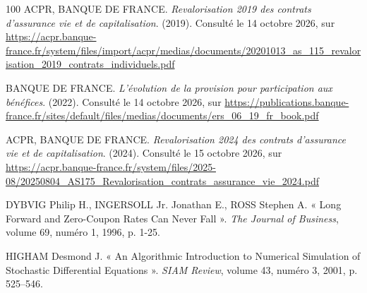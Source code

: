 \begin{thebibliography}{100}
ACPR, BANQUE DE FRANCE. \textit{Revalorisation 2019 des contrats d'assurance vie et de capitalisation}. (2019). Consulté le 14 octobre 2026, sur \url{https://acpr.banque-france.fr/system/files/import/acpr/medias/documents/20201013_as_115_revalorisation_2019_contrats_individuels.pdf}

BANQUE DE FRANCE. \textit{L'évolution de la provision pour participation aux bénéfices}. (2022). Consulté le 14 octobre 2026, sur \url{https://publications.banque-france.fr/sites/default/files/medias/documents/ers_06_19_fr_book.pdf}

ACPR, BANQUE DE FRANCE. \textit{Revalorisation 2024 des contrats d'assurance vie et de capitalisation}. (2024). Consulté le 15 octobre 2026, sur \url{https://acpr.banque-france.fr/system/files/2025-08/20250804_AS175_Revalorisation_contrats_assurance_vie_2024.pdf}

DYBVIG Philip H., INGERSOLL Jr. Jonathan E., ROSS Stephen A. « Long Forward and Zero-Coupon Rates Can Never Fall ». \textit{The Journal of Business}, volume 69, numéro 1, 1996, p. 1-25.

HIGHAM Desmond J. « An Algorithmic Introduction to Numerical Simulation of Stochastic Differential Equations ». \textit{SIAM Review}, volume 43, numéro 3, 2001, p. 525--546.

\end{thebibliography}